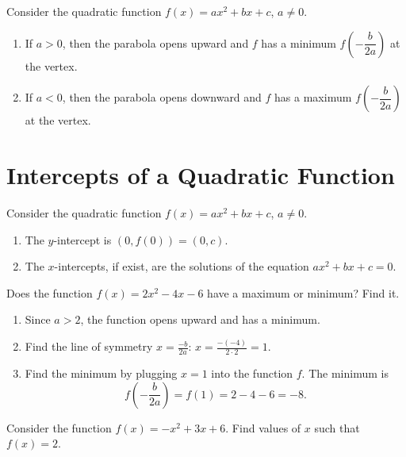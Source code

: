 \documentclass[en,12pt]{elegantbook}
\providecommand{\tightlist}{%
  \setlength{\itemsep}{0pt}\setlength{\parskip}{0pt}}
\providecommand{\tightlist}{%
  \setlength{\itemsep}{0pt}\setlength{\parskip}{0pt}}
\let\BeginKnitrBlock\begin \let\EndKnitrBlock\end
\begin{document}
Consider the quadratic function \(f(x)=ax^2+bx+c\), \(a\neq 0\).

\begin{enumerate}
\def\labelenumi{\arabic{enumi}.}
\tightlist
\item
  If \(a>0\), then the parabola opens upward and \(f\) has a minimum \(f\left(-\dfrac{b}{2a}\right)\) at the vertex.
\item
  If \(a<0\), then the parabola opens downward and \(f\) has a maximum \(f\left(-\dfrac{b}{2a}\right)\) at the vertex.
\end{enumerate}

\hypertarget{intercepts-of-a-quadratic-function}{%
\section{Intercepts of a Quadratic Function}\label{intercepts-of-a-quadratic-function}}

Consider the quadratic function \(f(x)=ax^2+bx+c\), \(a\neq 0\).

\begin{enumerate}
\def\labelenumi{\arabic{enumi}.}
\tightlist
\item
  The \(y\)-intercept is \((0, f(0))=(0, c)\).
\item
  The \(x\)-intercepts, if exist, are the solutions of the equation \(ax^2+bx+c=0\).
\end{enumerate}

\BeginKnitrBlock{example}
\protect\hypertarget{exm:unnamed-chunk-258}{}{\label{exm:unnamed-chunk-258} }
Does the function \(f(x)=2x^2-4x-6\) have a maximum or minimum? Find it.
\EndKnitrBlock{example}

\BeginKnitrBlock{solution}


\begin{enumerate}
\def\labelenumi{\arabic{enumi}.}
\tightlist
\item
  Since \(a>2\), the function opens upward and has a minimum.
\item
  Find the line of symmetry \(x=\frac{-b}{2a}\):
  \(x=\frac{-(-4)}{2\cdot 2}=1\).
\item
  Find the minimum by plugging \(x=1\) into the function \(f\).
  The minimum is
  \[
   f(-\frac{b}{2a})=f(1)=2-4-6=-8.
   \]
\end{enumerate}
\EndKnitrBlock{solution}

\BeginKnitrBlock{example}
\protect\hypertarget{exm:unnamed-chunk-260}{}{\label{exm:unnamed-chunk-260} }
Consider the function \(f(x)=-x^2+3x+6\). Find values of \(x\) such that \(f(x)=2\).
\EndKnitrBlock{example}
\end{document}
